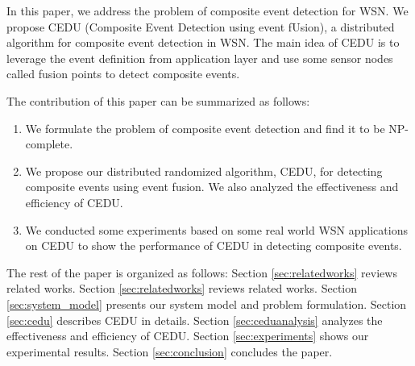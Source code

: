 In this paper, we address the problem of composite event detection for WSN. We propose CEDU (Composite Event Detection using event fUsion), a distributed algorithm for composite event detection in WSN. The main idea of CEDU is to leverage the event definition from application layer and use some sensor nodes called fusion points to detect composite events.

The contribution of this paper can be summarized as follows:
\begin{enumerate}
  \item We formulate the problem of composite event detection and find it to be NP-complete.
  \item We propose our distributed randomized algorithm, CEDU, for detecting composite events using event fusion. We also analyzed the effectiveness and efficiency of CEDU.
  \item We conducted some experiments based on some real world WSN applications on CEDU to show the performance of CEDU in detecting composite events.
\end{enumerate}
The rest of the paper is organized as follows: Section \ref{sec:relatedworks} reviews related works. Section \ref{sec:relatedworks} reviews related works. Section \ref{sec:system_model} presents our system model and problem formulation. Section \ref{sec:cedu} describes CEDU in details. Section \ref{sec:ceduanalysis} analyzes the effectiveness and efficiency of CEDU. Section \ref{sec:experiments} shows our experimental results. Section \ref{sec:conclusion} concludes the paper.